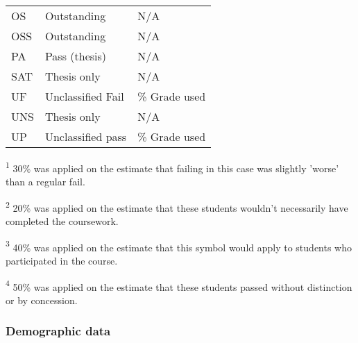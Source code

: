 \begin{table}[H]
\begin{threeparttable}
\begin{tabularx}{\textwidth}{>{\hsize=0.6\hsize}X>{\hsize=1.3\hsize}X>{\hsize=1.1\hsize}X}
            OS             & Outstanding              & N/A                                        \\
            OSS            & Outstanding              & N/A                                        \\
            PA             & Pass (thesis)            & N/A                                        \\
            SAT            & Thesis only              & N/A                                        \\
            UF             & Unclassified Fail        & 30\% Grade used\tnote{\textsuperscript{1}} \\
            UNS            & Thesis only              & N/A                                        \\
            UP             & Unclassified pass        & 50\% Grade used\tnote{\textsuperscript{4}} \\
            \bottomrule
        \end{tabularx}
        \scriptsize
        \begin{tablenotes}
            \item[\textsuperscript{1}]30\% was applied on the estimate that failing in this case was slightly 'worse' than a regular fail.
            \item[\textsuperscript{2}]20\% was applied on the estimate that these students wouldn't necessarily have completed the coursework.
            \item[\textsuperscript{3}]40\% was applied on the estimate that this symbol would apply to students who participated in the course.
            \item[\textsuperscript{4}]50\% was applied on the estimate that these students passed without distinction or by concession.
        \end{tablenotes}
    \end{threeparttable}
\end{table}




\subsubsection{Demographic data}
\label{appendix:demographic-data}


